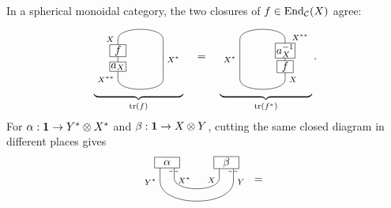 \documentclass{amsart}
\begin{document}
\begin{lemma}\label{lem:sph2}
In a spherical monoidal category, the two closures of $f\in\mathrm{End}_{\mathcal{C}}(X)$ agree:
\[
\underbrace{\begin{tikzpicture}[x=.85cm,y=-.85cm,baseline=(current bounding box.center)]
\draw (0,.3) .. controls (0,-.2) and (1.7,-.2) .. (1.7,.3)
 -- (1.7,1.8) .. controls (1.7,2.3) and (0,2.3) .. (0,1.8);
\draw (0,.3)--(0,1.8);
\node[draw,fill=white,minimum width=.52cm,minimum height=.3cm,inner sep=1pt] at (0,.725) {$f$};
\node[draw,fill=white,minimum width=.52cm,minimum height=.3cm,inner sep=1pt] at (0,1.325) {$a_X$};
\node[left] at (0,.3) {\scriptsize $X$};
\node[left] at (0,1.8) {\scriptsize $X^{**}$};
\node[right] at (1.7,1.05) {\scriptsize $X^*$};
\end{tikzpicture}}_{\tr(f)}
\quad=\quad
\underbrace{\begin{tikzpicture}[x=.85cm,y=-.85cm,baseline=(current bounding box.center)]
\draw (1.7,.3) .. controls (1.7,-.2) and (0,-.2) .. (0,.3)
 -- (0,1.8) .. controls (0,2.3) and (1.7,2.3) .. (1.7,1.8);
\draw (1.7,.3)--(1.7,1.8);
\node[draw,fill=white,minimum width=.52cm,minimum height=.3cm,inner sep=1pt] at (1.7,.725) {$a_X^{-1}$};
\node[draw,fill=white,minimum width=.52cm,minimum height=.3cm,inner sep=1pt] at (1.7,1.325) {$f$};
\node[right=2.5pt] at (1.7,.22) {\scriptsize $X^{**}$};
\node[right] at (1.7,1.8) {\scriptsize $X$};
\node[left] at (0,1.05) {\scriptsize $X^*$};
\end{tikzpicture}}_{\tr(f^*)}.
\]
For $\alpha:{\bf 1}\to Y^*\otimes X^*$ and
$\beta:{\bf 1}\to X\otimes Y$, cutting the same closed diagram in different places gives
\[
\begin{tikzpicture}[x=.9cm,y=-.9cm,baseline=(current bounding box.center)]
\draw (.85,0)--(.85,.55) .. controls (.85,1.05) and (2.45,1.05) .. (2.45,.55)--(2.45,0);
\draw (.35,0)--(.35,.65) .. controls (.35,1.6) and (2.95,1.6) .. (2.95,.65)--(2.95,0);
\node[left] at (.35,.68) {\scriptsize $Y^*$};
\node[right] at (.85,.62) {\scriptsize $X^*$};
\node[left] at (2.45,.62) {\scriptsize $X$};
\node[right] at (2.95,.68) {\scriptsize $Y$};
\draw[densely dashed] (.68,.31)--(1.02,.31) (2.78,.31)--(3.12,.31);
\node[draw,fill=white,minimum width=.8cm,minimum height=.34cm,inner sep=1pt] at (.6,0) {$\alpha$};
\node[draw,fill=white,minimum width=.8cm,minimum height=.34cm,inner sep=1pt] at (2.7,0) {$\beta$};
\end{tikzpicture}
\;=\;
\begin{tikzpicture}[x=.9cm,y=-.9cm,baseline=(current bounding box.center)]

\end{tikzpicture}\]
\end{lemma}
\end{document}
